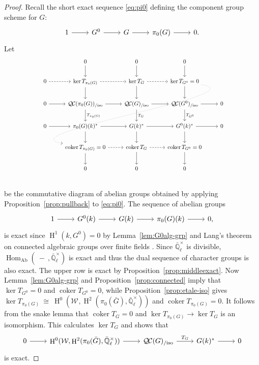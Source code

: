 \documentclass{amsart}
\theoremstyle{plain}
\theoremstyle{definition}
\theoremstyle{remark}
\newcommand{\EE}{\mathbb{\bar Q}_\ell}
\newcommand{\Fq}{k}
\newcommand{\EEx}{\EE^\times}
\newcommand{\Weil}[1]{\mathcal{W}_{#1}}
\DeclareMathOperator{\Hom}{Hom}
\DeclareMathOperator{\coker}{coker}
\DeclareMathOperator{\Hh}{H}
\newcommand{\iso}{{\ \cong\ }}
\newcommand{\TrFrob}[1]{T_{#1}}
\newcommand{\QC}{{\mathcal{Q\hskip-0.8pt C}}}
\newcommand{\QCiso}[1]{\QC(#1)_{/\text{iso}}}
\newcommand{\bG}{\bar{G}}
\begin{document}
\begin{proof}
  Recall the short exact sequence \eqref{eq:pi0}
  defining the component group scheme for $G$:
  \[
  \begin{tikzcd}
    1 \rar & G^0 \rar & G \rar & \pi_0(G) \rar & 0.
  \end{tikzcd}
  \]
  Let
  \[
  \begin{tikzcd}[row sep=20]
  & 0 \arrow{d} & 0 \arrow{d} & 0\arrow{d} \\
    0 \arrow[dashed]{r} & \ker \TrFrob{\pi_0(G)} \arrow[dashed]{r} \dar & \arrow{d} \ker \TrFrob{G} \arrow[dashed]{r} & \ker \TrFrob{G^0} =0 \arrow[dotted, out=-10, in=170]{dddll} \dar & \\
    0 \rar & \QCiso{\pi_0(G)} \rar \dar{\TrFrob{\pi_0(G)}}
    & \QCiso{G} \rar \dar{\TrFrob{G}} & \QCiso{G^0} \rar \dar{\TrFrob{G^0}} & 0\\
    0 \rar & \pi_0(G)(\Fq)^* \rar \dar
    & \arrow{d} G(\Fq)^* \rar & G^0(\Fq)^* \rar \dar & 0\\
    & \arrow{d} \coker \TrFrob{\pi_0(G)} =0 \arrow[dashed]{r} & \arrow{d} \coker \TrFrob{G} \arrow[dashed]{r} &  \arrow{d} \coker \TrFrob{G^0} =0 & \\
      & 0 & 0 & 0 \\
  \end{tikzcd}
  \]
  be the commutative diagram of abelian groups obtained by applying
  Proposition~\ref{prop:pullback} to \eqref{eq:pi0}.
  The sequence of abelian groups
  \begin{equation}\label{eq:pi0k}
  \begin{tikzcd}
    1 \rar & G^0(\Fq) \rar & G(\Fq) \rar & \pi_0(G)(\Fq) \rar & 0,
  \end{tikzcd}
  \end{equation}
  is exact since $\Hh^1(\Fq,G^0) =0$ by Lemma~\ref{lem:G0alg-grp} and Lang's theorem on connected algebraic groups over finite fields \cite{lang:56a}.
  Since $\EEx$ is divisible, $\Hom_\text{Ab}(\ - \ ,\EEx)$ is exact and thus the dual sequence of
  character groups is also exact.
%
  The upper row is exact by Proposition~\ref{prop:middleexact}.
  Now Lemma~\ref{lem:G0alg-grp} and Proposition~\ref{prop:connected}
  imply that $\ker \TrFrob{G^0} =0$ and $\coker \TrFrob{G^0}=0$,
  while Proposition~\ref{prop:etale-iso} gives $\ker \TrFrob{\pi_0(G)} \iso \Hh^0(\Weil{},\Hh^2(\pi_0({\bar G}),\EEx))$
  and $\coker \TrFrob{\pi_0(G)}=0$.
%
It follows from the snake lemma that $\coker \TrFrob{G} =0$
and $\ker \TrFrob{\pi_0(G)} \to \ker \TrFrob{G}$ is an isomorphism.
This calculates $\ker  \TrFrob{G}$ and shows that
\[
  \begin{tikzcd}
0 \arrow{r} & \Hh^0(\Weil{},\Hh^2(\pi_0(\bG),\EEx)) \arrow{r} & \QCiso{G} \arrow{r}{\TrFrob{G}} & G(\Fq)^* \arrow{r} & 0 
  \end{tikzcd}
\]
is exact.
\end{proof}
\end{document}
